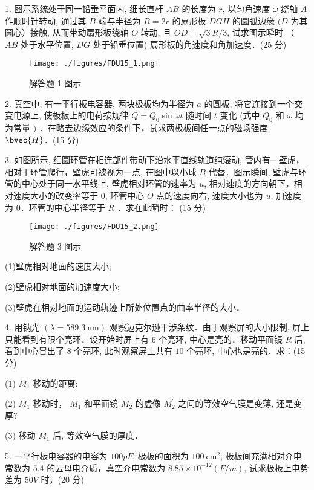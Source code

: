 
1. 图示系统处于同一铅垂平面内, 细长直杆 $A B$ 的长度为 $r$, 以匀角速度 $\omega$ 绕轴 $A$ 作顺时针转动, 通过其 $B$ 端与半径为 $R=2 r$ 的扇形板 $D G H$ 的圆弧边缘 $(D$ 为其圆心）接触, 从而带动扇形板绕轴 $O$ 转动, 且 $O D=\sqrt{3} R / 3$, 试求图示瞬时 （ $A B$ 处于水平位置, $D G$ 处于铅垂位置) 扇形板的角速度和角加速度．(25 分)

\begin{figure}[ht]
\centering
\texttt{[image: ./figures/FDU15\_1.png]}
\caption{解答题 1 图示} \label{FDU15_fig1}
\end{figure}

2. 真空中, 有一平行板电容器, 两块极板均为半径为 $a$ 的圆板, 将它连接到一个交变电源上, 使极板上的电荷按规律 $Q=Q_{0} \sin \omega t$ 随时间 $t$ 变化 (式中 $Q_{0}$ 和 $\omega$ 均为常量 $)$ ．在略去边缘效应的条件下，试求两极板间任一点的磁场强度 $\bvec{H}$．(15 分)

3. 如图所示, 细圆环管在相连部件带动下沿水平直线轨道纯滚动, 管内有一壁虎，相对于环管爬行，壁虎可被视为一点, 在图中以小球 $B$ 代替．图示瞬间, 壁虎与环管的中心处于同一水平线上, 壁虎相对环管的速率为 $u$, 相对速度的方向朝下，相对速度大小的改变率等于 $0$, 环管中心 $O$ 点的速度向右, 速度大小也为 $u$, 加速度为 $0$．环管的中心半径等于 $R$ ．求在此瞬时：
(15 分)

\begin{figure}[ht]
\centering
\texttt{[image: ./figures/FDU15\_2.png]}
\caption{解答题 3 图示} \label{FDU15_fig2}
\end{figure}

(1)壁虎相对地面的速度大小;

(2)壁虎相对地面的加速度大小;

(3)壁虎在相对地面的运动轨迹上所处位置点的曲率半径的大小．

4. 用钠光 $(\lambda=589.3 \mathrm{~nm})$ 观察迈克尔逊干涉条纹．由于观察屏的大小限制, 屏上只能看到有限个亮环．设开始时屏上有 $6$ 个亮环, 中心是亮的．移动平面镜 $R$ 后, 看到中心冒出了 $8$ 个亮环, 此时观察屏上共有 $10$ 个亮环, 中心也是亮的．求：(15 分)

(1) $M_{1}$ 移动的距离:

(2) $M_{1}$ 移动时， $M_{1}$ 和平面镜 $M_{2}$ 的虚像 $M_{2}^{\prime}$ 之间的等效空气膜是变薄, 还是变厚?

(3) 移动 $M_{1}$ 后, 等效空气膜的厚度．

5. 一平行板电容器的电容为 $100 p F$, 极板的面积为 $100 \mathrm{~cm}^{2}$, 极板间充满相对介电常数为 $5.4$ 的云母电介质，真空介电常数为 $8.85 \times 10^{-12}(F / m)$, 试求极板上电势差为 $50 V$ 时，(20 分)

